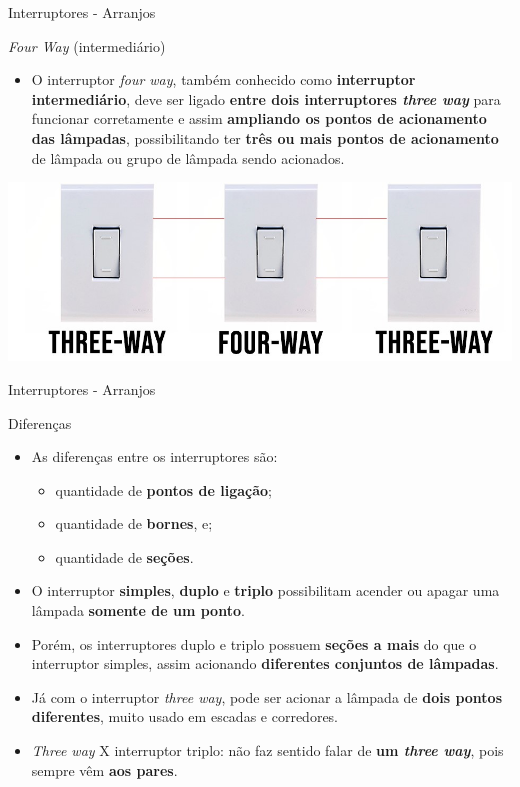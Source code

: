 \begin{frame}{Interruptores - Arranjos}
	\begin{block}{\textit{Four Way} (intermediário)}
		\begin{itemize}
			\item
			      O interruptor \textit{four way}, também conhecido como \textbf{interruptor intermediário}, deve ser ligado \textbf{entre dois interruptores \textit{three way}} para funcionar corretamente e assim \textbf{ampliando os pontos de acionamento das lâmpadas}, possibilitando ter \textbf{três ou mais pontos de acionamento} de lâmpada ou grupo de lâmpada sendo acionados.
		\end{itemize}
	\end{block}

	\vspace{0.5cm}

	\centering
	\includegraphics[width=0.6\linewidth]{Figuras/Ch08/fig15}
\end{frame}


\begin{frame}{Interruptores - Arranjos}
	\begin{block}{Diferenças}
		\begin{itemize}
			\item As diferenças entre os interruptores são:
			      \begin{itemize}
				      \item\normalsize quantidade de \textbf{pontos de ligação};
				      \item\normalsize quantidade de \textbf{bornes}, e;
				      \item\normalsize quantidade de \textbf{seções}.
			      \end{itemize}
			\item O interruptor \textbf{simples}, \textbf{duplo} e \textbf{triplo} possibilitam acender ou apagar uma lâmpada \textbf{somente de um ponto}.
			\item Porém, os interruptores duplo e triplo possuem \textbf{seções a mais} do que o interruptor simples, assim acionando \textbf{diferentes conjuntos de lâmpadas}.
			\item Já com o interruptor \textit{three way}, pode ser acionar a lâmpada de \textbf{dois pontos diferentes}, muito usado em escadas e corredores.
			\item \textit{Three way} X interruptor triplo: não faz sentido falar de \textbf{um \textit{three way}}, pois sempre vêm \textbf{aos pares}.
		\end{itemize}
	\end{block}

\end{frame}


